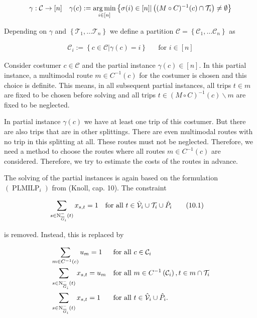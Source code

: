 \begin{align*}
	\gamma: \mathcal{C}\to[n] && \gamma(c):=\operatorname*{arg\,min}_{i\in[n]}\left\{\sigma(i)\in[n]|\left((M\circ C)^{-1}(c)\cap\mathcal{T}_i\right)\neq\emptyset\right\}
\end{align*}

Depending on $\gamma$ and $\left\{\mathcal{T}_1,\dots\mathcal{T}_n\right\}$ we define a partition $\mathcal{C}=\left\{\mathcal{C}_1,\dots\mathcal{C}_n\right\}$ as

\begin{align}
	\mathcal{C}_i := \left\{c\in\mathcal{C}|\gamma(c)=i\right\} && \text{for } i\in[n]
\end{align}

Consider costumer $c\in\mathcal{C}$ and the partial instance $\gamma(c)\in[n]$. In this partial instance, a multimodal route $m\in C^{-1}(c)$ for the costumer is chosen and this choice is definite. This means, in all subsequent partial instances, all trips $t\in m$ are fixed to be chosen before solving and all trips $t\in(M\circ C)^{-1}(c)\backslash m$ are fixed to be neglected.

In partial instance $\gamma(c)$ we have at least one trip of this costumer. But there are also trips that are in other splittings. There are even multimodal routes with no trip in this splitting at all. These routes must not be neglected. Therefore, we need a method to choose the routes where all routes $m\in C^{-1}(c)$ are considered. Therefore, we try to estimate the costs of the routes in advance.

The solving of the partial instances is again based on the formulation $(\operatorname{PLMILP}_i)$ from (Knoll, cap. 10). The constraint

\begin{align}
	\sum_{s\in\operatorname{N}_{\overline{G}_i}^-(t)} x_{s,t} = 1 &&& \text{for all } t\in\hat{\mathcal{V}}_i\cup\mathcal{T}_i\cup\hat{P}_i \tag{10.1}
\end{align}

is removed. Instead, this is replaced by

\begin{align}
	&\sum_{m\in C^{-1}(c)} u_m = 1 && \text{for all } c\in\mathcal{C}_i \label{eq:TMILP:costumer} \\
	&\sum_{s\in\operatorname{N}_{\overline{G}_i}^-(t)} x_{s,t} = u_m && \text{for all } m\in C^{-1}\left(\mathcal{C}_i\right), t\in m\cap\mathcal{T}_i \label{eq:TMILP:route} \\
	&\sum_{s\in\operatorname{N}_{\overline{G}_i}^-(t)} x_{s,t} = 1 && \text{for all } t\in\hat{\mathcal{V}}_i\cup\hat{P}_i \label{eq:TMILP:pv}.
\end{align}

